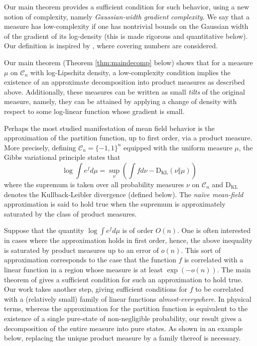 \documentclass[12pt]{article}
\def \DC {\mathcal{C}_n}
\def \KL {\mathrm{D}_{\mathrm{KL}}}
\theoremstyle{definition}
\theoremstyle{remark}
\begin{document}
Our main theorem provides a sufficient condition for such behavior, using a new notion of complexity, namely \textit{Gaussian-width gradient complexity}. We say that a measure has low-complexity if one has nontrivial bounds on the Gaussian width of the gradient of its log-density (this is made rigorous and quantitative below). Our definition is inspired by \cite{CD14}, where covering numbers are considered. 

Our main theorem (Theorem \ref{thm:maindecomp} below) shows that for a measure $\mu$ on $\DC$ with log-Lipschitz density, a low-complexity condition implies the existence of an approximate decomposition into product measures as described above. Additionally, these measures can be written as small \emph{tilts} of the original measure, namely, they can be attained by applying a change of density with respect to some log-linear function whose gradient is small.

Perhaps the most studied manifestation of mean field behavior is the approximation of the partition function, up to first order, via a product measure. More precisely, defining $\DC= \{-1,1\}^n$ equipped with the uniform measure $\mu$, the Gibbs variational principle states that
\begin{equation}\label{eq:Gibbs}
\log \int e^f d \mu = \sup_{\nu} \left ( \int f d \nu - \KL(\nu \Vert \mu) \right )
\end{equation}
where the supremum is taken over all probability measures $\nu$ on $\DC$ and $\KL$ denotes the Kullback-Leibler divergence (defined below). The \emph{na\"ive mean-field} approximation is said to hold true when the supremum is approximately saturated by the class of product measures. 

Suppose that the quantity $\log \int e^f d \mu$ is of order $O(n)$. One is often interested in cases where the approximation holds in first order, hence, the above inequality is saturated by product measures up to an error of $o(n)$. This sort of approximation corresponds to the case that the function $f$ is correlated with a linear function in a region whose measure is at least $\exp(-o(n))$. The main theorem of \cite{CD14} gives a sufficient condition for such an approximation to hold true. Our work takes another step, giving sufficient conditions for $f$ to be correlated with a (relatively small) family of linear functions \textit{almost-everywhere}. In physical terms, whereas the approximation for the partition function is equivalent to the existence of a single pure-state of non-negligible probability, our result gives a decomposition of the entire measure into pure states. As shown in an example below, replacing the unique product measure by a family thereof is necessary.
\end{document}
